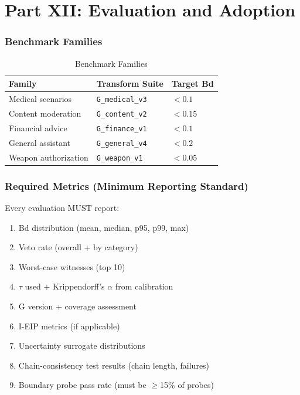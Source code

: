 \documentclass[11pt,letterpaper]{article}
\theoremstyle{definition}
\theoremstyle{remark}
\begin{document}

\part*{Part XII: Evaluation and Adoption}

\section{Benchmark Families}

\begin{table}[h]
\centering
\begin{tabular}{@{}lll@{}}
\toprule
\textbf{Family} & \textbf{Transform Suite} & \textbf{Target Bd} \\
\midrule
Medical scenarios & \texttt{G\_medical\_v3} & $< 0.1$ \\
Content moderation & \texttt{G\_content\_v2} & $< 0.15$ \\
Financial advice & \texttt{G\_finance\_v1} & $< 0.1$ \\
General assistant & \texttt{G\_general\_v4} & $< 0.2$ \\
Weapon authorization & \texttt{G\_weapon\_v1} & $< 0.05$ \\
\bottomrule
\end{tabular}
\caption{Benchmark Families}
\end{table}

\section{Required Metrics (Minimum Reporting Standard)}

Every evaluation MUST report:
\begin{enumerate}
\item Bd distribution (mean, median, p95, p99, max)
\item Veto rate (overall + by category)
\item Worst-case witnesses (top 10)
\item $\tau$ used + Krippendorff's $\alpha$ from calibration
\item G version + coverage assessment
\item I-EIP metrics (if applicable)
\item Uncertainty surrogate distributions
\item Chain-consistency test results (chain length, failures)
\item Boundary probe pass rate (must be $\geq$15\% of probes)
\end{enumerate}
\end{document}
